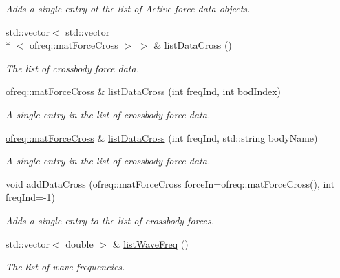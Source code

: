 \begin{DoxyCompactItemize}
\begin{DoxyCompactList}\small\item\em Adds a single entry ot the list of Active force data objects. \end{DoxyCompactList}\item 
std\-::vector$<$ std\-::vector\\*
$<$ \hyperlink{classosea_1_1ofreq_1_1mat_force_cross}{ofreq\-::mat\-Force\-Cross} $>$ $>$ \& \hyperlink{classosea_1_1ofreq_1_1hydro_data_a2543a86d437288af8d1fbd17e63ba4f6}{list\-Data\-Cross} ()
\begin{DoxyCompactList}\small\item\em The list of crossbody force data. \end{DoxyCompactList}\item 
\hyperlink{classosea_1_1ofreq_1_1mat_force_cross}{ofreq\-::mat\-Force\-Cross} \& \hyperlink{classosea_1_1ofreq_1_1hydro_data_a6a0e897110b962e5642a6b5bfeb5b1be}{list\-Data\-Cross} (int freq\-Ind, int bod\-Index)
\begin{DoxyCompactList}\small\item\em A single entry in the list of crossbody force data. \end{DoxyCompactList}\item 
\hyperlink{classosea_1_1ofreq_1_1mat_force_cross}{ofreq\-::mat\-Force\-Cross} \& \hyperlink{classosea_1_1ofreq_1_1hydro_data_af4f50c85bbe169038a5d79844347d71f}{list\-Data\-Cross} (int freq\-Ind, std\-::string body\-Name)
\begin{DoxyCompactList}\small\item\em A single entry in the list of crossbody force data. \end{DoxyCompactList}\item 
void \hyperlink{classosea_1_1ofreq_1_1hydro_data_a50efd747da5dfc1e0975db8ea97e8278}{add\-Data\-Cross} (\hyperlink{classosea_1_1ofreq_1_1mat_force_cross}{ofreq\-::mat\-Force\-Cross} force\-In=\hyperlink{classosea_1_1ofreq_1_1mat_force_cross}{ofreq\-::mat\-Force\-Cross}(), int freq\-Ind=-\/1)
\begin{DoxyCompactList}\small\item\em Adds a single entry to the list of crossbody forces. \end{DoxyCompactList}\item 
std\-::vector$<$ double $>$ \& \hyperlink{classosea_1_1ofreq_1_1hydro_data_a4373065f995b1b305929e085d2b2218d}{list\-Wave\-Freq} ()
\begin{DoxyCompactList}\small\item\em The list of wave frequencies. \end{DoxyCompactList}\item 

\end{DoxyCompactItemize}
